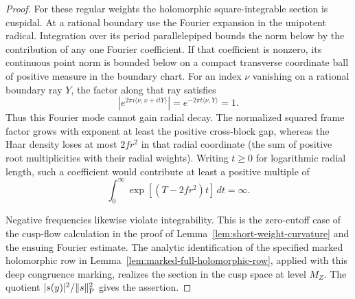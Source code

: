 \begin{proof}
For these regular weights the holomorphic square-integrable section is cuspidal. At a rational boundary use the Fourier expansion in the unipotent radical. Integration over its period parallelepiped bounds the norm below by the contribution of any one Fourier coefficient. If that coefficient is nonzero, its continuous point norm is bounded below on a compact transverse coordinate ball of positive measure in the boundary chart. For an index \(\nu\) vanishing on a rational boundary ray \(Y\), the factor along that ray satisfies
\[
    \left|e^{2\pi i\langle\nu,x+itY\rangle}\right|
                         = e^{-2\pi t\langle\nu,Y\rangle}=1.
\]
Thus this Fourier mode cannot gain radial decay. The normalized squared frame factor grows with exponent at least the positive cross-block gap, whereas the Haar density loses at most \(2fr^2\) in that radial coordinate (the sum of positive root multiplicities with their radial weights). Writing \(t\ge0\) for logarithmic radial length, such a coefficient would contribute at least a positive multiple of
\[
             \int_0^\infty\exp[(T-2fr^2)t]\,dt=\infty .
\]

Negative frequencies likewise violate integrability. This is the zero-cutoff case of the cusp-flow calculation in the proof of Lemma~\ref{lem:short-weight-curvature} and the ensuing Fourier estimate. The analytic identification of the specified marked holomorphic row in Lemma~\ref{lem:marked-full-holomorphic-row}, applied with this deep congruence marking, realizes the section in the cusp space at level \(M_Z\). The quotient \(|s(y)|^2/\|s\|_{\rm P}^2\) gives the assertion.
\end{proof}
